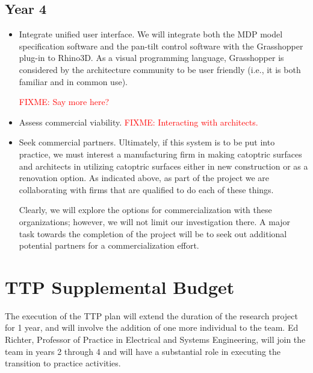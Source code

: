 \documentclass[11pt]{article}
\newcommand{\FIXME}[1]{\textcolor{red}{FIXME: #1}}
\begin{document}
\subsection*{Year 4}

\begin{itemize}

\item Integrate unified user interface.
We will integrate both the MDP model specification software and the
pan-tilt control software with the Grasshopper plug-in to Rhino3D.
As a visual programming language, Grasshopper is considered by
the architecture community to be user friendly (i.e., it is both familiar
and in common use).

\FIXME{Say more here?}

\item Assess commercial viability. \FIXME{Interacting with architects.}

\item Seek commercial partners.
Ultimately, if this system is to be put into practice, we must interest
a manufacturing firm in making catoptric surfaces and architects in utilizing
catoptric surfaces either in new construction or as a renovation option.
As indicated above, as part of the project
we are collaborating with firms that are qualified to
do each of these things.

Clearly, we will explore the options for commercialization with these
organizations; however, we will not limit our investigation there.  A major
task towards the completion of the project will be to seek out additional
potential partners for a commercialization effort.

\end{itemize}

\section{TTP Supplemental Budget}

The execution of the TTP plan will extend the duration of the research
project for 1 year, and will involve the addition of one more individual
to the team.  Ed Richter, Professor of Practice in Electrical and Systems
Engineering, will join the team in years 2 through 4 and will have a
substantial role in executing the transition to practice activities.
\end{document}
